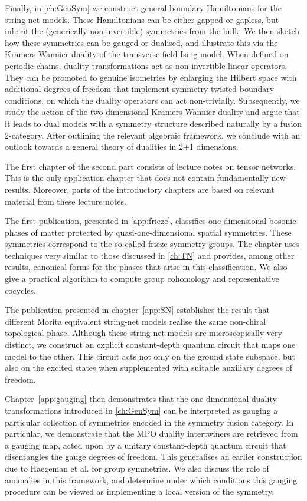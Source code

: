 Finally, in \cref{ch:GenSym} we construct general boundary Hamiltonians for the string-net models. These Hamiltonians can be either gapped or gapless, but inherit the (generically non-invertible) symmetries from the bulk. We then sketch how these symmetries can be gauged or dualised, and illustrate this via the Kramers-Wannier duality of the transverse field Ising model. When defined on periodic chains, duality transformations act as non-invertible linear operators. They can be promoted to genuine isometries by enlarging the Hilbert space with additional degrees of freedom that implement symmetry-twisted boundary conditions, on which the duality operators can act non-trivially. Subsequently, we study the action of the two-dimensional Kramers-Wannier duality and argue that it leads to dual models with a symmetry structure described naturally by a fusion 2-category. After outlining the relevant algebraic framework, we conclude with an outlook towards a general theory of dualities in 2+1 dimensions.

The first chapter of the second part consists of lecture notes on tensor networks. This is the only application chapter that does not contain fundamentally new results. Moreover, parts of the introductory chapters are based on relevant material from these lecture notes.

The first publication, presented in \cref{app:frieze}, classifies one-dimensional bosonic phases of matter protected by quasi-one-dimensional spatial symmetries. These symmetries correspond to the so-called frieze symmetry groups. The chapter uses techniques very similar to those discussed in \cref{ch:TN} and provides, among other results, canonical forms for the phases that arise in this classification. We also give a practical algorithm to compute group cohomology and representative cocycles.

The publication presented in chapter~\ref{app:SN} establishes the result that different Morita equivalent string-net models realise the same non-chiral topological phase. Although these string-net models are microscopically very distinct, we construct an explicit constant-depth quantum circuit that maps one model to the other. This circuit acts not only on the ground state subspace, but also on the excited states when supplemented with suitable auxiliary degrees of freedom.

Chapter~\ref{app:gauging} then demonstrates that the one-dimensional duality transformations introduced in \cref{ch:GenSym} can be interpreted as gauging a particular collection of symmetries encoded in the symmetry fusion category. In particular, we demonstrate that the MPO duality intertwiners are retrieved from a gauging map, acted upon by a unitary constant-depth quantum circuit that disentangles the gauge degrees of freedom. This generalises an earlier construction due to Haegeman et al. for group symmetries. We also discuss the role of anomalies in this framework, and determine under which conditions this gauging procedure can be viewed as implementing a local version of the symmetry.

